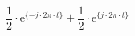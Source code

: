 \[
\frac{1}{2}\cdot\textrm{e}^{\{-j \cdot 2\pi \cdot t \}}
+\frac{1}{2}\cdot\textrm{e}^{\{ j \cdot 2\pi \cdot t \}}
\]
